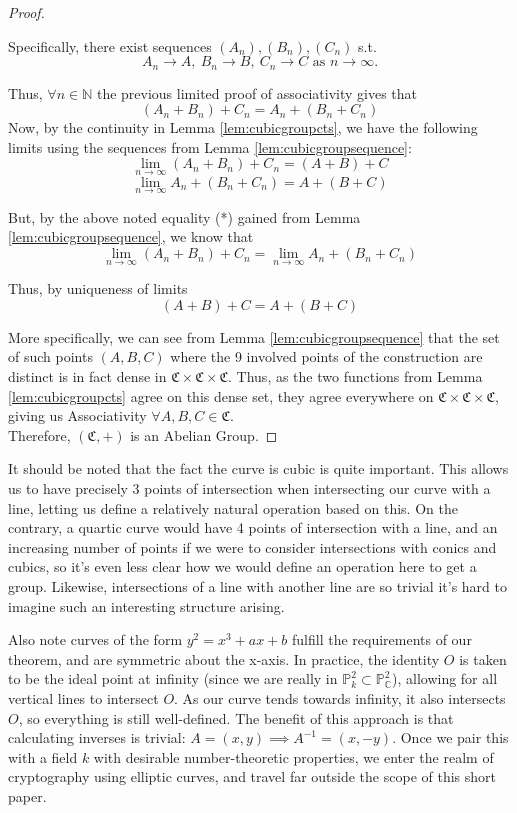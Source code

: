 \begin{proof}
\begin{lemma}
Specifically, there exist sequences $(A_n), (B_n), (C_n)$ s.t.
\[
A_n \to A,~B_n \to B,~C_n \to C \text{ as } n \to \infty.
\]
\end{lemma}

Thus, $\forall n \in \mathbb{N}$ the previous limited proof of associativity gives
that 
\[
	(A_n+B_n)+C_n = A_n+(B_n+C_n) \tag{*}
\]
Now, by the continuity in Lemma \ref{lem:cubicgroupcts},
we have the following limits using the sequences from Lemma \ref{lem:cubicgroupsequence}:
\[
	\lim_{n \to \infty} (A_n + B_n) + C_n = (A+B)+C
\]
\[
	\lim_{n \to \infty} A_n + (B_n + C_n) = A+(B+C)
\]

But, by the above noted equality (*) gained from Lemma \ref{lem:cubicgroupsequence},
we know that 
\[
	\lim_{n \to \infty} (A_n + B_n) + C_n = \lim_{n \to \infty} A_n + (B_n + C_n) 
\]

Thus, by uniqueness of limits
\[
	(A+B)+C = A+(B+C)
\]


More specifically, we can see from Lemma \ref{lem:cubicgroupsequence} that the set of
such points $(A,B,C)$ where the 9 involved points of the construction are distinct
is in fact dense in $\mathfrak{C} \times \mathfrak{C} \times \mathfrak{C}$. Thus,
as the two functions from Lemma \ref{lem:cubicgroupcts} agree on this
dense set, they agree everywhere on $\mathfrak{C} \times \mathfrak{C} \times \mathfrak{C}$,
giving us Associativity $\forall A,B,C \in \mathfrak{C}$.\\

Therefore, $(\mathfrak{C},+)$ is an Abelian Group.
\end{proof}

It should be noted that the fact the curve is cubic is quite important.
This allows us to have precisely 3 points of intersection when intersecting
our curve with a line, letting us define a relatively natural
operation based on this. On the contrary, a quartic curve would have 4
points of intersection with a line, and an increasing number of points
if we were to consider intersections with conics and cubics, so 
it's even less clear how we would define an operation here to get a group.
Likewise, intersections of a line with another line are so trivial
it's hard to imagine such an interesting structure arising.

Also note curves of the form $y^2 = x^3 + ax + b$ fulfill the requirements
of our theorem, and are symmetric about the x-axis. In practice,
the identity $O$ is taken to be the ideal point at infinity (since we are
really in $\mathbb{P}^2_k \subset \mathbb{P}^2_\mathbb{C}$), allowing
for all vertical lines to intersect $O$. As our curve tends towards
infinity, it also intersects $O$, so everything is still well-defined.
The benefit of this approach is that calculating inverses is trivial:
$A=(x,y) \implies A^{-1} = (x, -y)$. Once we pair this with a field $k$
with desirable number-theoretic properties, we enter the realm of
cryptography using elliptic curves, and travel far outside the
scope of this short paper.

